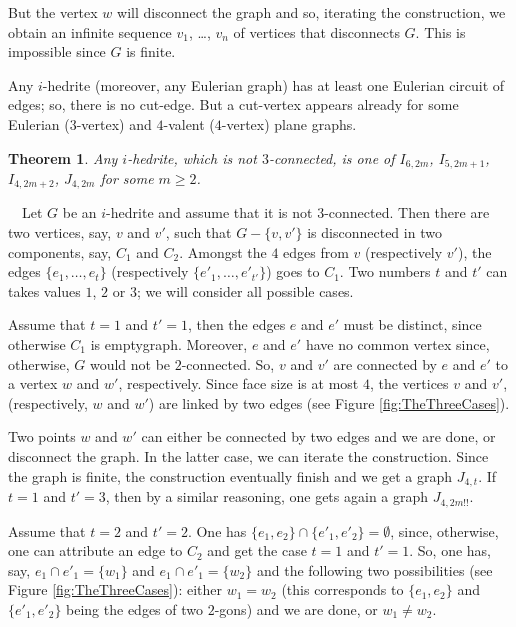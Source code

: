 \documentclass[12pt]{article}
\newtheorem{theorem}{Theorem}
\newcommand{\proof}{\noindent{\bf Proof.}\ \ }
\begin{document}
\begin{center}
\epsfxsize=60mm
\end{center}

But the vertex $w$ will disconnect the graph and so, iterating the construction, we obtain an infinite sequence $v_1$, \dots, $v_n$ of vertices that disconnects $G$. 
This is impossible since $G$ is finite.


Any $i$-hedrite (moreover, any Eulerian graph) has at least one 
Eulerian circuit of edges; so, there is no cut-edge.
But a cut-vertex appears already for some Eulerian ($3$-vertex)
and $4$-valent ($4$-vertex) plane graphs.


\begin{theorem}\label{3-connectedness}
Any $i$-hedrite, which is not $3$-connected, is one of $I_{6,2m}$, $I_{5, 2m+1}$, $I_{4, 2m+2}$, $J_{4, 2m}$ for some $m\geq 2$.


\end{theorem}

\proof Let $G$ be an $i$-hedrite and assume that it is not $3$-connected. 
Then there are two vertices, say, $v$ and $v'$, such that 
$G-\{v, v'\}$ is disconnected in two components, say, $C_1$ and $C_2$.
Amongst the $4$ edges from $v$ (respectively $v'$), the edges 
$\{e_1,\dots, e_{t}\}$ (respectively $\{e'_1,\dots, e'_{t'}\}$) goes
to $C_1$. Two numbers $t$ and $t'$ can takes values $1$, $2$ or $3$; we
will consider all possible cases.

Assume that $t=1$ and $t'=1$, then the edges $e$ and $e'$ must be
distinct, since otherwise $C_1$ is emptygraph. Moreover, $e$ and $e'$ have
no common vertex since, otherwise, $G$ would not be $2$-connected.
So, $v$ and $v'$ are connected by $e$ and $e'$ to a vertex $w$ and $w'$,
respectively. Since face size is at most $4$, the vertices $v$ and $v'$,
(respectively, $w$ and $w'$) are linked by two edges
(see Figure \ref{fig:TheThreeCases}).

Two points $w$ and $w'$ can either be connected by two edges and
we are done, or disconnect the graph. In the latter case, we can iterate
the construction. Since the graph is finite, the construction eventually
finish and we get a graph $J_{4,t}$. If $t=1$ and
$t'=3$, then by a similar reasoning, one gets again a graph 
$J_{4,2m!!}$.

Assume that $t=2$ and $t'=2$. One has $\{e_1, e_2\}\cap \{e'_1, e'_2\}=\emptyset$, since, otherwise, one can attribute an edge to $C_2$ and get the case
$t=1$ and $t'=1$. So, one has, say, $e_1\cap e'_1=\{w_1\}$ and 
$e_1\cap e'_1=\{w_2\}$ and the following two possibilities 
(see Figure \ref{fig:TheThreeCases}): either $w_1=w_2$ (this
corresponds to $\{e_1, e_2\}$ and $\{e'_1, e'_2\}$ being the edges
of two $2$-gons) and we are done, or $w_1\not= w_2$.
\end{document}

